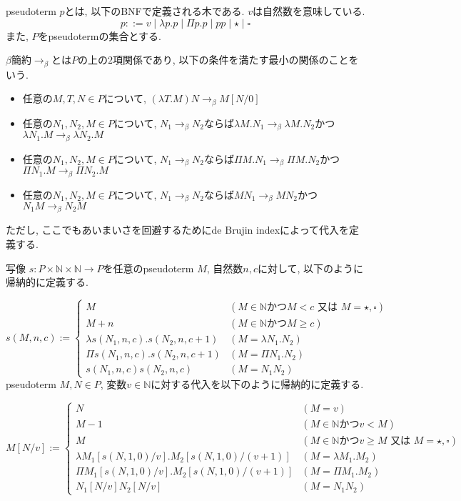 \documentclass[12pt, titlepage]{ltjsarticle}
\begin{document}
\begin{defn}
 pseudoterm $p$とは, 以下のBNFで定義される木である. $v$は自然数を意味している.
 \[
 p ::= v \mid \lambda p. p \mid \Pi p. p \mid p p \mid \star \mid \square
 \]
 また, $P$をpseudotermの集合とする.
\end{defn}

\begin{defn}
 $\beta$簡約$\rightarrow_{\beta}$とは$P$の上の$2$項関係であり, 以下の条件を満たす最小の関係のことをいう.
 \begin{itemize}
  \item 任意の$M, T, N \in P$について, $(\lambda T. M) N \rightarrow_\beta M[N/0]$
  \item 任意の$N_1, N_2, M \in P$について, $N_1 \rightarrow_\beta N_2$ならば$\lambda M. N_1 \rightarrow_\beta \lambda M. N_2$かつ$\lambda N_1. M \rightarrow_\beta \lambda N_2. M$
  \item 任意の$N_1, N_2, M \in P$について, $N_1 \rightarrow_\beta N_2$ならば$\Pi M. N_1 \rightarrow_\beta \Pi M. N_2$かつ$\Pi N_1. M \rightarrow_\beta \Pi N_2. M$
  \item 任意の$N_1, N_2, M \in P$について, $N_1 \rightarrow_\beta N_2$ならば$M N_1 \rightarrow_\beta M N_2$かつ$N_1 M \rightarrow_\beta N_2 M$
 \end{itemize}
\end{defn}

 ただし, ここでもあいまいさを回避するためにde Brujin indexによって代入を定義する.

\begin{defn}
 写像 $s \colon P \times \mathbb{N} \times \mathbb{N} \rightarrow P$を任意のpseudoterm $M$, 自然数$n, c$に対して, 以下のように帰納的に定義する.

\[
  s (M, n, c) := \begin{cases}
    M & (M \in \mathbb{N} \text{かつ} M < c \text{ 又は } M = \star, \square) \\
    M + n & (M \in \mathbb{N} \text{かつ} M \geq c) \\
    \lambda s (N_1, n, c). s (N_2, n, c + 1) & (M = \lambda N_1. N_2) \\
    \Pi s (N_1, n, c). s (N_2, n, c + 1) & (M = \Pi N_1. N_2) \\
    s (N_1, n, c) s (N_2, n, c) & (M = N_1 N_2)
  \end{cases}
\]
 pseudoterm $M, N \in P$, 変数$v \in \mathbb{N}$に対する代入を以下のように帰納的に定義する.

\[
 M[N/v] := \begin{cases}
    N & (M = v) \\
    M - 1 & (M \in \mathbb{N} \text{かつ} v < M) \\
    M & (M \in \mathbb{N} \text{かつ} v \geq M \text{ 又は } M = \star, \square) \\
    \lambda M_1 [s (N, 1, 0)/v]. M_2 [s (N, 1, 0)/(v + 1)] & (M = \lambda M_1. M_2) \\
    \Pi M_1 [s (N, 1, 0)/v]. M_2 [s (N, 1, 0)/(v + 1)] & (M = \Pi M_1. M_2) \\
    N_1[N/v] N_2[N/v] & (M = N_1 N_2)
  \end{cases}
\]
\end{defn}
\end{document}
